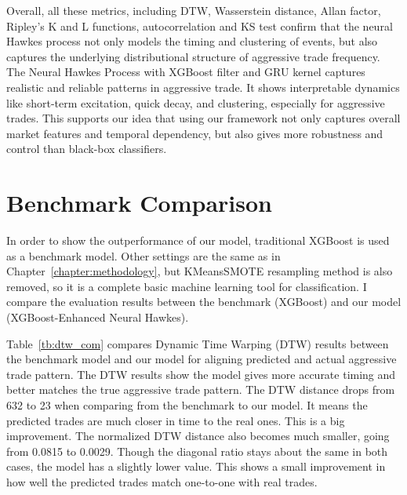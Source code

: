 Overall, all these metrics, including DTW, Wasserstein distance, Allan factor, Ripley's K and L functions, autocorrelation and KS test confirm that the neural Hawkes process not only models the timing and clustering of events, but also captures the underlying distributional structure of aggressive trade frequency. The Neural Hawkes Process with XGBoost filter and GRU kernel captures realistic and reliable patterns in aggressive trade. It shows interpretable dynamics like short-term excitation, quick decay, and clustering, especially for aggressive trades. This supports our idea that using our framework not only captures overall market features and temporal dependency, but also gives more robustness and control than black-box classifiers.


\newpage

\section{Benchmark Comparison} \label{sec:benchmark}
In order to show the outperformance of our model, traditional XGBoost is used as a benchmark model. Other settings are the same as in Chapter~\ref{chapter:methodology}, but KMeansSMOTE resampling method is also removed, so it is a complete basic machine learning tool for classification. I compare the evaluation results between the benchmark (XGBoost) and our model (XGBoost-Enhanced Neural Hawkes). 

Table~\ref{tb:dtw_com} compares Dynamic Time Warping (DTW) results between the benchmark model and our model for aligning predicted and actual aggressive trade pattern. The DTW results show the model gives more accurate timing and better matches the true aggressive trade pattern. The DTW distance drops from 632 to 23 when comparing from the benchmark to our model. It means the predicted trades are much closer in time to the real ones. This is a big improvement. The normalized DTW distance also becomes much smaller, going from 0.0815 to 0.0029. Though the diagonal ratio stays about the same in both cases, the model has a slightly lower value. This shows a small improvement in how well the predicted trades match one-to-one with real trades.

